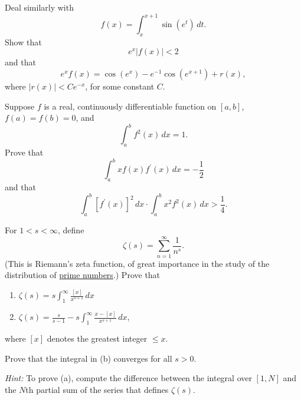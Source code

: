   \begin{exercise}[Rudin 6.14]
    Deal similarly with
    \begin{equation}
      f(x) = \int_x^{x+1} \sin (e^t) \, dt.
    \end{equation}
    Show that
    \begin{equation}
      e^x |f(x)| < 2
    \end{equation}
    and that
    \begin{equation}
      e^x f(x) = \cos(e^x) - e^{-1} \cos(e^{x+1}) + r(x),
    \end{equation}
    where $|r(x)| < Ce^{-x}$, for some constant $C$.
  \end{exercise}
  \begin{solution}

  \end{solution}

  \begin{exercise}[Rudin 6.15]
    Suppose $f$ is a real, continuously differentiable function on $[a, b]$, $f(a) = f(b) = 0$, and
    \begin{equation}
      \int_a^b f^2(x) \, dx = 1.
    \end{equation}
    Prove that
    \begin{equation}
      \int_a^b xf(x) f^\prime(x) \, dx = -\frac{1}{2}
    \end{equation}
    and that
    \begin{equation}
      \int_a^b [f^\prime(x)]^2 \, dx \cdot \int_a^b x^2 f^2(x) \, dx > \frac{1}{4}.
    \end{equation}
  \end{exercise}
  \begin{solution}

  \end{solution}

  \begin{exercise}[Rudin 6.16]
    For $1 < s < \infty$, define
    \begin{equation}
      \zeta(s) = \sum_{n=1}^\infty \frac{1}{n^s}.
    \end{equation}
    (This is Riemann's zeta function, of great importance in the study of the distribution of \hyperref[thm:prime-number-theorem]{prime numbers}.) Prove that
    \begin{enumerate}
      \item[(a)] $\zeta(s) = s \int_1^\infty \frac{[x]}{x^{s+1}} \, dx$
      \item[(b)] $\zeta(s) = \frac{s}{s-1} - s \int_1^\infty \frac{x - [x]}{x^{s+1}} \, dx$,
    \end{enumerate}
    where $[x]$ denotes the greatest integer $\le x$.
    \par Prove that the integral in (b) converges for all $s > 0$.
    \par \textit{Hint:} To prove (a), compute the difference between the integral over $[1, N]$ and the $N$th partial sum of the series that defines $\zeta(s)$.
  \end{exercise}
  \begin{solution}

  \end{solution}


